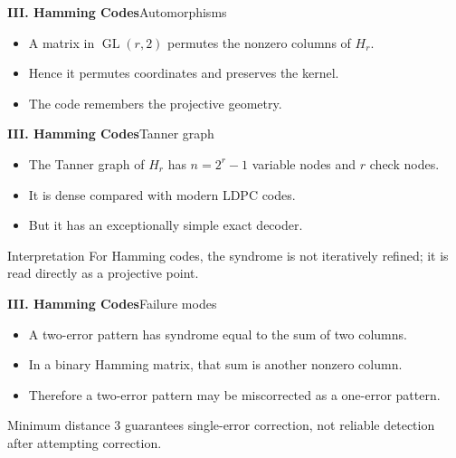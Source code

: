 \begin{frame}{\textbf{III. Hamming Codes}}{Automorphisms}
\small
{}
\begin{itemize}
  \item A matrix in $\operatorname{GL}(r,2)$ permutes the nonzero columns of $H_r$.
  \item Hence it permutes coordinates and preserves the kernel.
  \item The code remembers the projective geometry.
\end{itemize}
\end{frame}

\begin{frame}{\textbf{III. Hamming Codes}}{Tanner graph}
\small
\begin{itemize}
  \item The Tanner graph of $H_r$ has $n=2^r-1$ variable nodes and $r$ check nodes.
  \item It is dense compared with modern LDPC codes.
  \item But it has an exceptionally simple exact decoder.
\end{itemize}
\begin{block}{Interpretation}
For Hamming codes, the syndrome is not iteratively refined; it is read directly as a projective point.
\end{block}
\end{frame}

\begin{frame}{\textbf{III. Hamming Codes}}{Failure modes}
\small
\begin{itemize}
  \item A two-error pattern has syndrome equal to the sum of two columns.
  \item In a binary Hamming matrix, that sum is another nonzero column.
  \item Therefore a two-error pattern may be miscorrected as a one-error pattern.
\end{itemize}
Minimum distance $3$ guarantees single-error correction, not reliable detection after attempting correction.
\end{frame}

